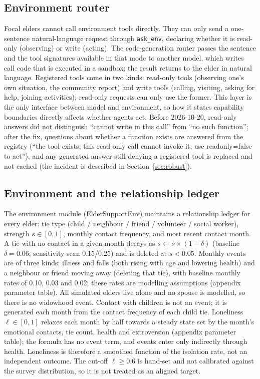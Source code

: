 \documentclass[10pt,twocolumn]{article}
\begin{document}
\subsection{Environment router}\label{sec:router}
Focal elders cannot call environment tools directly. They can only send a one-sentence natural-language request through \texttt{ask\_env}, declaring whether it is read-only (observing) or write (acting). The code-generation router passes the sentence and the tool signatures available in that mode to another model, which writes call code that is executed in a sandbox; the result returns to the elder in natural language. Registered tools come in two kinds: read-only tools (observing one's own situation, the community report) and write tools (calling, visiting, asking for help, joining activities); read-only requests can only use the former. This layer is the only interface between model and environment, so how it states capability boundaries directly affects whether agents act. Before 2026-10-20, read-only answers did not distinguish ``cannot write in this call'' from ``no such function''; after the fix, questions about whether a function exists are answered from the registry (``the tool exists; this read-only call cannot invoke it; use readonly=false to act''), and any generated answer still denying a registered tool is replaced and not cached (the incident is described in Section~\ref{sec:robust}).

\subsection{Environment and the relationship ledger}
The environment module (ElderSupportEnv) maintains a relationship ledger for every elder: tie type (child / neighbour / friend / volunteer / social worker), strength $s\in[0,1]$, monthly contact frequency, and most recent contact month. A tie with no contact in a given month decays as $s \leftarrow s\times(1-\delta)$ (baseline $\delta=0.06$; sensitivity scan 0.15/0.25) and is deleted at $s<0.05$. Monthly events are of three kinds: illness and falls (both rising with age and lowering health) and a neighbour or friend moving away (deleting that tie), with baseline monthly rates of 0.10, 0.03 and 0.02; these rates are modelling assumptions (appendix parameter table). All simulated elders live alone and no spouse is modelled, so there is no widowhood event. Contact with children is not an event; it is generated each month from the contact frequency of each child tie. Loneliness $\ell\in[0,1]$ relaxes each month by half towards a steady state set by the month's emotional contacts, tie count, health and extroversion (appendix parameter table); the formula has no event term, and events enter only indirectly through health. Loneliness is therefore a smoothed function of the isolation rate, not an independent outcome. The cut-off $\ell\ge0.6$ is hand-set and not calibrated against the survey distribution, so it is not treated as an aligned target.
\end{document}
